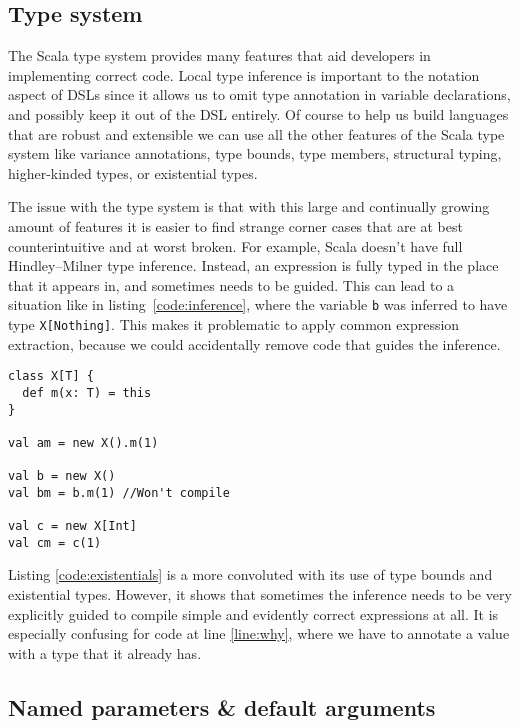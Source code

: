 \subsection{Type system}

The Scala type system provides many features that aid developers in implementing correct code.
Local type inference is important to the notation aspect of DSLs since it allows us to omit type annotation in variable declarations, and possibly keep it out of the DSL entirely.
Of course to help us build languages that are robust and extensible we can use all the other features of the Scala type system like variance annotations, type bounds, type members, structural typing, higher-kinded types, or existential types.

The issue with the type system is that with this large and continually growing amount of features it is easier to find strange corner cases that are at best counterintuitive and at worst broken.
For example, Scala doesn't have full Hindley–Milner type inference.
Instead, an expression is fully typed in the place that it appears in, and sometimes needs to be guided.
This can lead to a situation like in listing~\ref{code:inference}, where the variable \texttt{b} was inferred to have type \texttt{X[Nothing]}.
This makes it problematic to apply common expression extraction, because we could accidentally remove code that guides the inference.

\begin{lstlisting}[caption=Local inference, label=code:inference, float]
class X[T] {
  def m(x: T) = this
}

val am = new X().m(1)

val b = new X()
val bm = b.m(1) //Won't compile

val c = new X[Int]
val cm = c(1)
\end{lstlisting}

Listing \ref{code:existentials} is a more convoluted with its use of type bounds and existential types.
However, it shows that sometimes the inference needs to be very explicitly guided to compile simple and evidently correct expressions at all.
It is especially confusing for code at line \ref{line:why}, where we have to annotate a value with a type that it already has.

\subsection{Named parameters \& default arguments}

